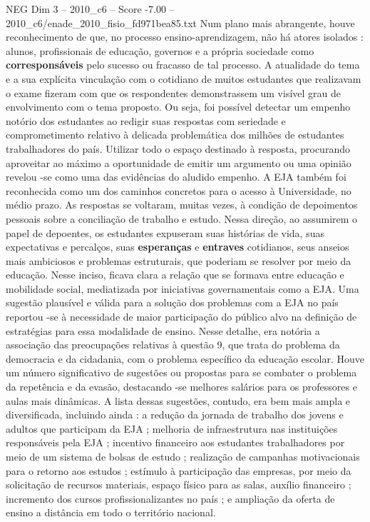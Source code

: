 \begin{textsample}{NEG Dim 3 – 2010\_c6 – Score -7.00 – 2010\_c6/enade\_2010\_fisio\_fd971bea85.txt}
Num plano mais abrangente, houve reconhecimento de que, no processo ensino-aprendizagem, não há atores isolados : alunos, profissionais de educação, governos e a própria sociedade como \textbf{corresponsáveis} pelo sucesso ou fracasso de tal processo.
A atualidade do tema e a sua explícita vinculação com o cotidiano de muitos estudantes que realizavam o exame fizeram com que os respondentes demonstrassem um visível grau de envolvimento com o tema proposto.
Ou seja, foi possível detectar um empenho notório dos estudantes ao redigir suas respostas com seriedade e comprometimento relativo à delicada problemática dos milhões de estudantes trabalhadores do país.
Utilizar todo o espaço destinado à resposta, procurando aproveitar ao máximo a oportunidade de emitir um argumento ou uma opinião revelou -se como uma das evidências do aludido empenho.
A EJA também foi reconhecida como um dos caminhos concretos para o acesso à Universidade, no médio prazo.
As respostas se voltaram, muitas vezes, à condição de depoimentos pessoais sobre a conciliação de trabalho e estudo.
Nessa direção, ao assumirem o papel de depoentes, os estudantes expuseram suas histórias de vida, suas expectativas e percalços, suas \textbf{esperanças} e \textbf{entraves} cotidianos, seus anseios mais ambiciosos e problemas estruturais, que poderiam se resolver por meio da educação.
Nesse inciso, ficava clara a relação que se formava entre educação e mobilidade social, mediatizada por iniciativas governamentais como a EJA.
Uma sugestão plausível e válida para a solução dos problemas com a EJA no país reportou -se à necessidade de maior participação do público alvo na definição de estratégias para essa modalidade de ensino.
Nesse detalhe, era notória a associação das preocupações relativas à questão 9, que trata do problema da democracia e da cidadania, com o problema específico da educação escolar.
Houve um número significativo de sugestões ou propostas para se combater o problema da repetência e da evasão, destacando -se melhores salários para os professores e aulas mais dinâmicas.
A lista dessas sugestões, contudo, era bem mais ampla e diversificada, incluindo ainda : a redução da jornada de trabalho dos jovens e adultos que participam da EJA ; melhoria de infraestrutura nas instituições responsáveis pela EJA ; incentivo financeiro aos estudantes trabalhadores por meio de um sistema de bolsas de estudo ; realização de campanhas motivacionais para o retorno aos estudos ; estímulo à participação das empresas, por meio da solicitação de recursos materiais, espaço físico para as salas, auxílio financeiro ; incremento dos cursos profissionalizantes no país ; e ampliação da oferta de ensino a distância em todo o território nacional.

\end{textsample}
